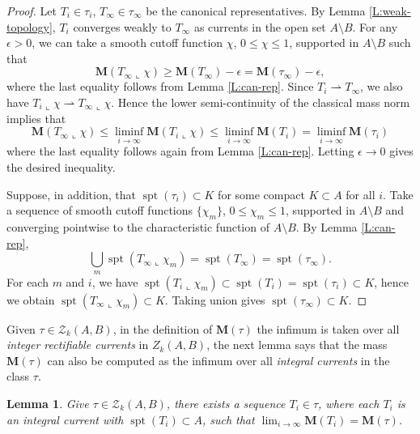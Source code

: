 \documentclass[10pt]{amsart}
\newtheorem{lemma}[theorem]{Lemma}
\theoremstyle{definition}
\theoremstyle{remark}
\numberwithin{equation}{section}
\newcommand{\weakto}{\rightharpoonup}
\newcommand{\lc}{\llcorner}
\newcommand{\ep}{\epsilon}
\newcommand{\Z}{\mathcal{Z}}
\newcommand{\M}{\mathbf{M}}
\newcommand{\spt}{\operatorname{spt}}
\begin{document}
\begin{proof}
Let $T_i \in \tau_i$, $T_\infty \in \tau_\infty$ be the canonical representatives. By Lemma \ref{L:weak-topology}, $T_i$ converges weakly to $T_\infty$ as currents in the open set $A \setminus B$. For any $\ep>0$, we can take a smooth cutoff function $\chi$, $0\leq \chi\leq 1$, supported in $A \setminus B$ such that 
\[ \M(T_{\infty}\lc \chi)\geq \M(T_{\infty})-\ep=\M(\tau_{\infty})-\ep, \]
where the last equality follows from Lemma \ref{L:can-rep}. Since $T_i \weakto T_{\infty}$, we also have $T_i\lc \chi \weakto T_{\infty}\lc \chi$. Hence the lower semi-continuity of the classical mass norm \cite[26.13]{Simon} implies that 
\[ \M(T_{\infty}\lc \chi)\leq \liminf_{i\rightarrow\infty}\M(T_i\lc \chi)\leq \liminf_{i\rightarrow\infty}\M(T_i)=\liminf_{i\rightarrow\infty}\M(\tau_i)\]
where the last equality follows again from Lemma \ref{L:can-rep}. Letting $\ep \to 0$ gives the desired inequality.

Suppose, in addition, that $\spt(\tau_i)\subset K$ for some compact $K \subset A$ for all $i$. Take a sequence of smooth cutoff functions $\{\chi_m\}$, $0\leq \chi_m\leq 1$, supported in $A \setminus B$ and converging pointwise to the characteristic function of $A \setminus B$. By Lemma \ref{L:can-rep}, 
\[ \bigcup_m \spt(T_{\infty}\lc \chi_m)=\spt(T_{\infty})=\spt(\tau_{\infty}).\]
For each $m$ and $i$, we have $\spt(T_i\lc \chi_m)\subset \spt(T_i)=\spt(\tau_i) \subset K$, hence we obtain $\spt(T_{\infty}\lc \chi_m)\subset K$. Taking union gives $\spt(\tau_\infty) \subset K$.
\end{proof}

Given $\tau \in \Z_k(A, B)$, in the definition of $\M(\tau)$ the infimum is taken over all \emph{integer rectifiable currents} in $Z_k(A, B)$, the next lemma says that the mass $\M(\tau)$ can also be computed as the infimum over all \emph{integral currents} in the class $\tau$.

\begin{lemma}
\label{L:integral}
Give $\tau\in\Z_k(A, B)$, there exists a sequence $T_i\in \tau$, where each $T_i$ is an integral current with $\spt(T_i) \subset A$, such that $\lim_{i\rightarrow \infty}\M(T_i)=\M(\tau)$.
\end{lemma}
\end{document}
